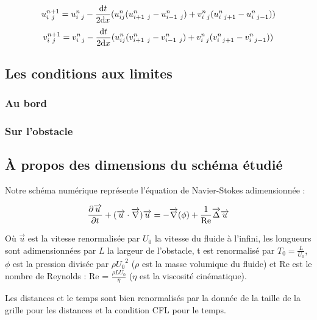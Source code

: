 		\begin{equation}
			u_{i \ j}^{n+1} = u_{i \ j}^n - \frac{\d t}{2 \d x}( u_{ij}^n(u_{i+1 \ j}^n-u_{i-1 \ j}^n) + v_{i \ j}^{n}(u_{i \ j+1}^n-u_{i \ j-1}^n)) \\
			\label{schema advection u}
		\end{equation}
		\[ 	v_{i \ j}^{n+1} = v_{i \ j}^n - \frac{\d t}{2 \d x}( u_{ij}^n(v_{i+1 \ j}^n-v_{i-1 \ j}^n) + v_{i \ j}^{n}(v_{i \ j+1}^n-v_{i \ j-1}^n))
		\]
		
		
		
	\subsection{Les conditions aux limites}
		
		\subsubsection{Au bord}
		
		\subsubsection{Sur l'obstacle}




	\subsection{À propos des dimensions du schéma étudié}
	
		Notre schéma numérique représente l'équation de Navier-Stokes 		adimensionnée :

		\begin{equation}
			\frac{\partial \overrightarrow{u}}{\partial t} + (\overrightarrow{u} \cdot 	\overrightarrow{\nabla}) \overrightarrow{u} = - \overrightarrow{\nabla} (\phi) + \frac{1}{\mathrm{Re}} \overrightarrow{\Delta} \overrightarrow{u}
			\label{NS}
		\end{equation}
	
		Où $\overrightarrow{u}$ est la vitesse renormalisée par $U_0$ la vitesse du fluide à l'infini,
		les longueurs sont adimensionnées par $L$ la largeur de l'obstacle,
		t est renormalisé par $T_0 = \frac{L}{U_0}$,
		$\phi$ est la pression divisée par $\rho {U_0}^2$ ($\rho$ est la masse volumique du fluide)
		et Re est le nombre de Reynolds : Re = $\frac{\rho L U_0}{\eta}$ ($\eta$ est la viscosité cinématique).
	    
	   
		Les distances et le temps sont bien renormalisés par la donnée de la taille de la grille pour les distances et la condition CFL pour le temps.
	
